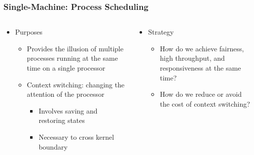 \begin{frame}[plain,t]
	\frametitle{Single-Machine: Process Scheduling}
	\begin{columns}[t]
		\begin{column}{.5\textwidth}
			
			\begin{itemize}\Large
				\item Purposes
				\begin{itemize}\large
					\item Provides the illusion of multiple
					processes running at the same
					time on a single processor
					\item Context switching: changing the
					attention of the processor
					\begin{itemize}\large
						\item Involves saving and restoring
						states
						\item Necessary to cross kernel
						boundary
					\end{itemize}
				\end{itemize}
			\end{itemize}
			
		\end{column}\pause
		
		\begin{column}{.5\textwidth}
			
			\begin{itemize}\Large
				\item Strategy
				\begin{itemize}\large
					\item How do we achieve fairness,
					high throughput, and
					responsiveness at the same
					time?
					\item How do we reduce or avoid the
					cost of context switching?
					
				\end{itemize}
			\end{itemize}
			
		\end{column}
	\end{columns}
\end{frame}

